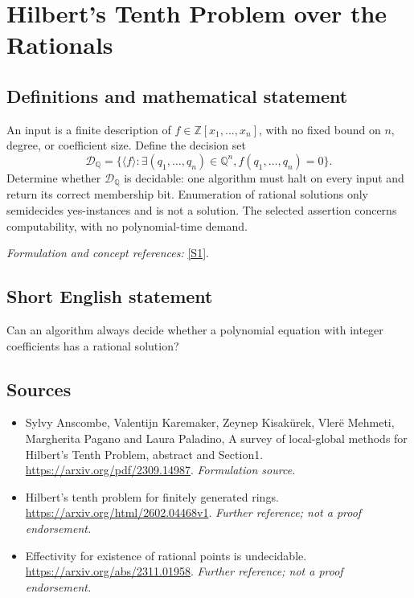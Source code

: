 \documentclass[11pt]{article}
\begin{document}
\section*{\texorpdfstring{Hilbert's Tenth Problem over the Rationals}{Hilbert's Tenth Problem over the Rationals}}\label{30006684}
\subsection{Definitions and mathematical statement}
An input is a finite description of $f\in{\mathbb{Z}}[x_1,\ldots,x_n]$, with no fixed bound on $n$, degree, or coefficient size. Define the decision set
\[
 \mathcal D_{{\mathbb{Q}}}=\{\langle f\rangle:\exists(q_1,\ldots,q_n)\in{\mathbb{Q}}^n,
                                  f(q_1,\ldots,q_n)=0\}.
\]
Determine whether $\mathcal D_{{\mathbb{Q}}}$ is decidable: one algorithm must halt on every input and return its correct membership bit. Enumeration of rational solutions only semidecides yes-instances and is not a solution. The selected assertion concerns computability, with no polynomial-time demand.
\par\smallskip\textit{Formulation and concept references:} \href{https://arxiv.org/pdf/2309.14987}{[S1]}.

\subsection{Short English statement}
Can an algorithm always decide whether a polynomial equation with integer coefficients has a rational solution?
\subsection{Sources}
\begin{itemize}
\item[S1]Sylvy Anscombe, Valentijn Karemaker, Zeynep Kisakürek, Vlerë Mehmeti, Margherita Pagano and Laura Paladino, A survey of local-global methods for Hilbert's Tenth Problem, abstract and Section1.
\url{https://arxiv.org/pdf/2309.14987}.
\textit{Formulation source.}
\item[S2]Hilbert's tenth problem for finitely generated rings.
\url{https://arxiv.org/html/2602.04468v1}.
\textit{Further reference; not a proof endorsement.}
\item[S3]Effectivity for existence of rational points is undecidable.
\url{https://arxiv.org/abs/2311.01958}.
\textit{Further reference; not a proof endorsement.}
\end{itemize}
\end{document}
